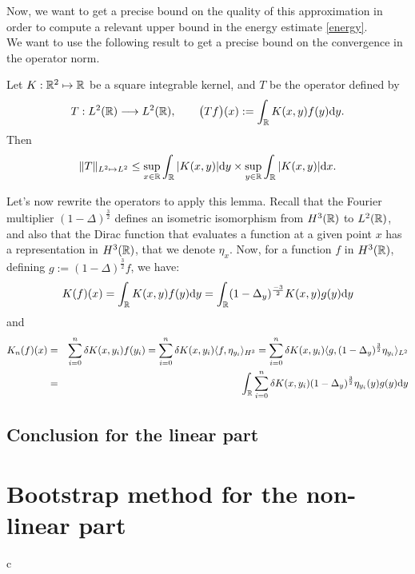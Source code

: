 \documentclass[11pt,a4paper]{article}
\begin{document}
Now, we want to get a precise bound on the quality of this approximation in order to compute a relevant upper bound in the energy estimate \ref{energy}. \\
We want to use the following result to get a precise bound on the convergence in the operator norm.
\begin{lemma}\label{schur}
Let $K: \mathbb R^2 \mapsto \mathbb R$ be a square integrable kernel, and $T$ be the operator defined by 
\[ T: L^2(\mathbb R) \longrightarrow L^2(\mathbb R), \qquad \big(Tf\big)(x) := \int_{\mathbb R}K(x,y) f(y)\mathrm{d}y. \] 
Then \[\displaystyle \|T\|_{L^2\mapsto L^2} \leq \sup_{x\in \mathbb R} \int_\mathbb R |K(x,y)|\mathrm{d}y\times  \sup_{y\in \mathbb R} \int_\mathbb R |K(x,y)|\mathrm{d}x.\] 
\end{lemma}

Let's now rewrite the operators to apply this lemma. Recall that the Fourier multiplier $(1-\Delta)^\frac{3}{2}$ defines an isometric isomorphism from $H^3(\mathbb R)$ to $L^2(\mathbb R)$, and also that the Dirac function that evaluates a function at a given point $x$ has a representation in $H^3(\mathbb R)$, that we denote $\eta_x$. Now, for a function $f$ in $H^3(\mathbb R)$, defining $g:=(1-\Delta)^\frac{3}{2}f$, we have: 
\[K(f)(x) = \int_\mathbb R K(x,y)f(y)\mathrm{d}y = \int_\mathbb R(1-\Delta_y)^\frac{-3}{2} K(x,y)g(y)\mathrm{d}y\]
and 
\begin{eqnarray*}
K_n(f)(x) &=& \sum_{i=0}^n \delta K(x,y_i)f(y_i) = \sum_{i=0}^n \delta K(x,y_i)\langle f, \eta_{y_i} \rangle_{H^3} =   \sum_{i=0}^n \delta K(x,y_i)\langle g, (1-\Delta_y)^\frac{3}{2}\eta_{y_i} \rangle_{L^2} \\
&=&\int_\mathbb R \sum_{i=0}^n \delta K(x,y_i)(1-\Delta_y)^\frac{3}{2}\eta_{y_i}(y)g(y)\mathrm{d}y 
\end{eqnarray*} 

\subsection{Conclusion for the linear part}





\section{Bootstrap method for the non-linear part}
c
\end{document}
